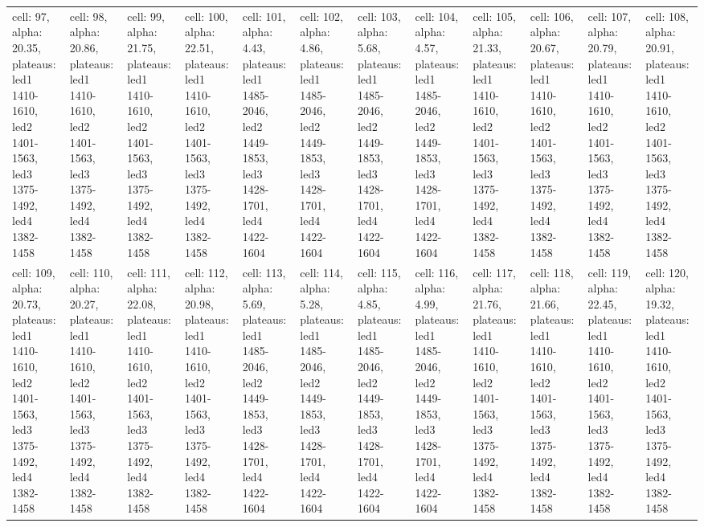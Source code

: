 \documentclass{article}
\begin{document}
\begin{landscape}
\begin{longtable}{|p{1.5cm}|p{1.5cm}|p{1.5cm}|p{1.5cm}|p{1.5cm}|p{1.5cm}|p{1.5cm}|p{1.5cm}|p{1.5cm}|p{1.5cm}|p{1.5cm}|p{1.5cm}|}
\rowcolor{lightgray} cell: 97, alpha: 20.35, plateaus: led1 1410-1610, led2 1401-1563, led3 1375-1492, led4 1382-1458 &cell: 98, alpha: 20.86, plateaus: led1 1410-1610, led2 1401-1563, led3 1375-1492, led4 1382-1458 &cell: 99, alpha: 21.75, plateaus: led1 1410-1610, led2 1401-1563, led3 1375-1492, led4 1382-1458 &cell: 100, alpha: 22.51, plateaus: led1 1410-1610, led2 1401-1563, led3 1375-1492, led4 1382-1458 &cell: 101, alpha: 4.43, plateaus: led1 1485-2046, led2 1449-1853, led3 1428-1701, led4 1422-1604 &cell: 102, alpha: 4.86, plateaus: led1 1485-2046, led2 1449-1853, led3 1428-1701, led4 1422-1604 &cell: 103, alpha: 5.68, plateaus: led1 1485-2046, led2 1449-1853, led3 1428-1701, led4 1422-1604 &cell: 104, alpha: 4.57, plateaus: led1 1485-2046, led2 1449-1853, led3 1428-1701, led4 1422-1604 &cell: 105, alpha: 21.33, plateaus: led1 1410-1610, led2 1401-1563, led3 1375-1492, led4 1382-1458 &cell: 106, alpha: 20.67, plateaus: led1 1410-1610, led2 1401-1563, led3 1375-1492, led4 1382-1458 &cell: 107, alpha: 20.79, plateaus: led1 1410-1610, led2 1401-1563, led3 1375-1492, led4 1382-1458 &cell: 108, alpha: 20.91, plateaus: led1 1410-1610, led2 1401-1563, led3 1375-1492, led4 1382-1458 \\
cell: 109, alpha: 20.73, plateaus: led1 1410-1610, led2 1401-1563, led3 1375-1492, led4 1382-1458 &cell: 110, alpha: 20.27, plateaus: led1 1410-1610, led2 1401-1563, led3 1375-1492, led4 1382-1458 &cell: 111, alpha: 22.08, plateaus: led1 1410-1610, led2 1401-1563, led3 1375-1492, led4 1382-1458 &cell: 112, alpha: 20.98, plateaus: led1 1410-1610, led2 1401-1563, led3 1375-1492, led4 1382-1458 &cell: 113, alpha: 5.69, plateaus: led1 1485-2046, led2 1449-1853, led3 1428-1701, led4 1422-1604 &cell: 114, alpha: 5.28, plateaus: led1 1485-2046, led2 1449-1853, led3 1428-1701, led4 1422-1604 &cell: 115, alpha: 4.85, plateaus: led1 1485-2046, led2 1449-1853, led3 1428-1701, led4 1422-1604 &cell: 116, alpha: 4.99, plateaus: led1 1485-2046, led2 1449-1853, led3 1428-1701, led4 1422-1604 &cell: 117, alpha: 21.76, plateaus: led1 1410-1610, led2 1401-1563, led3 1375-1492, led4 1382-1458 &cell: 118, alpha: 21.66, plateaus: led1 1410-1610, led2 1401-1563, led3 1375-1492, led4 1382-1458 &cell: 119, alpha: 22.45, plateaus: led1 1410-1610, led2 1401-1563, led3 1375-1492, led4 1382-1458 &cell: 120, alpha: 19.32, plateaus: led1 1410-1610, led2 1401-1563, led3 1375-1492, led4 1382-1458 \\

\end{longtable}
\end{landscape}
\end{document}
